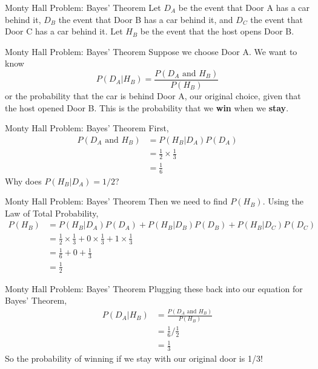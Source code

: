 \begin{frame}{Monty Hall Problem: Bayes' Theorem}
    Let $D_A$ be the event that Door A has a car behind it, $D_B$ the event that Door B has a car behind it, and $D_C$ the event that Door C has a car behind it. Let $H_B$ be the event that the host opens Door B. 
\end{frame}

\begin{frame}{Monty Hall Problem: Bayes' Theorem}
    Suppose we choose Door A. We want to know
    \[
        P(D_A | H_B) = \frac{P(D_A \text{ and }H_B)}{P(H_B)}
    \]
    or the probability that the car is behind Door A, our original choice, given that the host opened Door B. This is the probability that we \textbf{win} when we \textbf{stay}.
\end{frame}

\begin{frame}{Monty Hall Problem: Bayes' Theorem}
    First,
    \begin{align*}
        P(D_A \text{ and }H_B) &= P(H_B | D_A)P(D_A) \\
        &= \frac{1}{2}\times\frac{1}{3} \\
        &= \frac{1}{6}
    \end{align*}
    \vspace{12pt}Why does $P(H_B | D_A)=1/2$?
\end{frame}

\begin{frame}{Monty Hall Problem: Bayes' Theorem}
    Then we need to find $P(H_B)$. Using the Law of Total Probability,
    \begin{align*}
        P(H_B) &= P(H_B|D_A)P(D_A)+P(H_B|D_B)P(D_B)+P(H_B|D_C)P(D_C) \\
        &= \frac{1}{2}\times\frac{1}{3} + 0\times\frac{1}{3} + 1\times\frac{1}{3} \\
        &= \frac{1}{6} + 0 + \frac{1}{3} \\
        &= \frac{1}{2}
    \end{align*}
\end{frame}

\begin{frame}{Monty Hall Problem: Bayes' Theorem}
    Plugging these back into our equation for Bayes' Theorem,
    \begin{align*}
        P(D_A | H_B) &= \frac{P(D_A \text{ and }H_B)}{P(H_B)} \\
        &= \frac{1}{6}\bigg/\frac{1}{2} \\
        &= \frac{1}{3}
    \end{align*}
    So the probability of winning if we stay with our original door is 1/3! 
\end{frame}